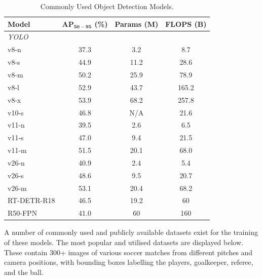 \begin{table}[H]
    \centering
    \caption{Commonly Used Object Detection Models.}
    \begin{tabular}{lccc}
        \toprule
        \textbf{Model} 
        & $\mathbf{AP_{50-95}}$ (\%) 
        & \textbf{Params} (M) 
        & \textbf{FLOPS} (\textbf{B}) \\
        \midrule
        \textit{YOLO} \cite{Redmon_2016_CVPR, UltralyticsYOLO} & & & \\
        \hspace{1em} v8-n  & 37.3 & 3.2  & 8.7 \\
        \hspace{1em} v8-s  & 44.9 & 11.2 & 28.6 \\
        \hspace{1em} v8-m  & 50.2 & 25.9 & 78.9 \\
        \hspace{1em} v8-l  & 52.9 & 43.7 & 165.2 \\
        \hspace{1em} v8-x  & 53.9 & 68.2 & 257.8 \\
        \hspace{1em} v10-s & 46.8 & N/A  & 21.6 \\
        \hspace{1em} v11-n & 39.5 & 2.6  & 6.5 \\
        \hspace{1em} v11-s & 47.0 & 9.4  & 21.5 \\
        \hspace{1em} v11-m & 51.5 & 20.1 & 68.0 \\
        \hspace{1em} v26-n & 40.9 & 2.4  & 5.4 \\
        \hspace{1em} v26-s & 48.6 & 9.5  & 20.7 \\
        \hspace{1em} v26-m & 53.1 & 20.4 & 68.2 \\
        RT-DETR-R18 \cite{Zhao2023RTDETR} & 46.5 & 19.2 & 60 \\
        R50-FPN \cite{7485869, Lin2017FPN} & 41.0 & 60 & 160 \\
        \bottomrule
    \end{tabular}
    \label{modelparams}
\end{table}


A number of commonly used and publicly available datasets exist for the training of these models. The most popular and utilised datasets are displayed below. These contain 300+ images of various soccer matches from different pitches and camera positions, with bounding boxes labelling the players, goalkeeper, referee, and the ball.

